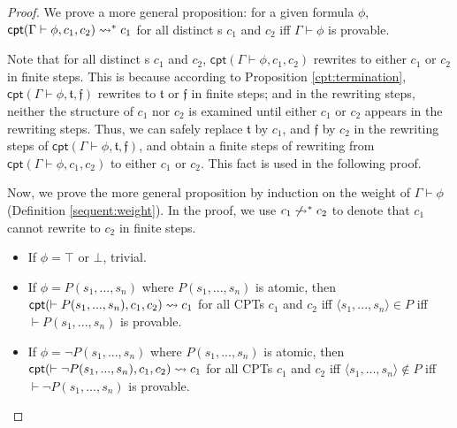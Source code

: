 \begin{proof}
		We prove a more general proposition: 
	for a given formula $\phi$, $\textsf{cpt}(\Gamma \vdash\phi, c_1, c_2) 
	\rightsquigarrow^* c_1$ for all distinct \CPT{}s $c_1$ and $c_2$ iff $\Gamma \vdash \phi$ is provable. 
	
	
	Note that for all distinct \CPT{}s $c_1$ and $c_2$, $\textsf{cpt}(\Gamma \vdash\phi, c_1, c_2)$ rewrites to either $c_1$ or $c_2$ in finite steps. This is because according to Proposition \ref{cpt:termination}, $\textsf{cpt}(\Gamma \vdash\phi, \mathfrak{t}, \mathfrak{f})$ rewrites to $\mathfrak{t}$ or $\mathfrak{f}$ in finite steps; and in the rewriting steps, neither the structure of $c_1$ nor $c_2$ is examined until either $c_1$ or $c_2$ appears in the rewriting steps. Thus, we can safely replace $\mathfrak{t}$ by $c_1$, and $\mathfrak{f}$ by $c_2$ in the rewriting steps of $\textsf{cpt}(\Gamma \vdash\phi, \mathfrak{t}, \mathfrak{f})$, and obtain a finite steps of rewriting from $\textsf{cpt}(\Gamma \vdash\phi, c_1, c_2)$ to either $c_1$ or $c_2$.
	This fact is used in the following proof. 
	
	
	Now, we prove the more general proposition by induction on the weight of $\Gamma\vdash\phi$ (Definition \ref{sequent:weight}). In the proof, we use $c_1\not\rightsquigarrow^*c_2$ to denote that \CPT{} $c_1$ cannot rewrite to \CPT $c_2$ in finite steps.
	\begin{itemize}
		\item If $\phi=\top$ or $\bot$, trivial.
		\item If $\phi=P(s_1,...,s_n)$ where $P(s_1,...,s_n)$ is atomic, then
		$\textsf{cpt}(\vdash P(s_1,...,s_n), c_1, c_2)\rightsquigarrow c_1$ for all \textsf{CPT}s $c_1$ and $c_2$ iff $\langle
		s_1,...,s_n\rangle \in P$ iff $\vdash P(s_1,...,s_n)$ is
		provable.
		\item If $\phi=\neg P(s_1,...,s_n)$ where $P(s_1,...,s_n)$ is atomic,
		then $\textsf{cpt}(\vdash \neg P(s_1,...,s_n), c_1, c_2)\rightsquigarrow c_1$ for all \textsf{CPT}s $c_1$ and $c_2$ iff
		$\langle s_1,...,s_n\rangle \notin P$ iff $\vdash \neg
		P(s_1,...,s_n)$ is provable.
		

\end{itemize}
\end{proof}
